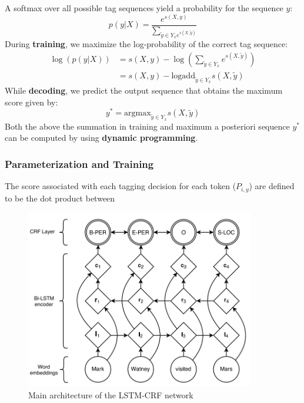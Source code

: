 \documentclass[a4paper, 12pt]{book} %
\begin{document}
A softmax over all possible tag sequences yield a probability for the sequence $y$:
\begin{equation}
p(y|X)=\frac{e^{s(X,y)}}{\sum_{\tilde{y} \in Y_x {e^{s(X,\tilde{y})}}}}
\end{equation}
During \textbf{training}, we maximize the log-probability of the correct tag sequence:
\begin{equation}
\begin{split}
\log{(p(y|X))} & = s(X,y) - \log{(\sum_{\tilde{y} \in Y_x} {e^{s(X,\tilde{y})}})} \\
& = s(X,y) - \mathrm{logadd}_{\tilde{y} \in Y_x} {s(X,\tilde{y})}
\end{split}
\end{equation}
While \textbf{decoding}, we predict the output sequence that obtains the maximum score given by:
\begin{equation}
y^*=\mathrm{argmax}_{\tilde{y} \in Y_x}{s(X,\tilde{y})}
\end{equation}
Both the above the summation in training and maximum a posteriori sequence $y^*$ can be computed by using \textbf{dynamic programming}.

\subsubsection{Parameterization and Training}
The score associated with each tagging decision for each token ($P_{i,y}$) are defined to be the dot product between 

\begin{figure}[htpb]
	\centering
	\includegraphics[width=10cm]{figures/lstm_crf.png}
	\caption{Main architecture of the LSTM-CRF network}
	\label{fig:boat1}
\end{figure}
\end{document}
